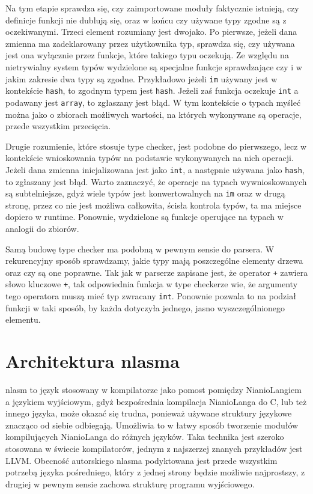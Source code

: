 \documentclass[licencjacka]{pracamgr}
\begin{document}
Na tym etapie sprawdza się, czy zaimportowane moduły faktycznie istnieją, czy definicje funkcji nie dublują się, oraz w końcu czy używane typy zgodne są z oczekiwanymi. Trzeci element rozumiany jest dwojako. Po pierwsze, jeżeli dana zmienna ma zadeklarowany przez użytkownika typ, sprawdza się, czy używana jest ona wyłącznie przez funkcje, które takiego typu oczekują.  Ze względu na nietrywialny system typów wydzielone są specjalne funkcje sprawdzające czy i w jakim zakresie dwa typy są zgodne. Przykładowo jeżeli \texttt{im} używany jest w kontekście \texttt{hash}, to zgodnym typem jest \texttt{hash}. Jeżeli zaś funkcja oczekuje \texttt{int} a podawany jest \texttt{array}, to zgłaszany jest błąd. W tym kontekście o typach myśleć można jako o zbiorach możliwych wartości, na których wykonywane są operacje, przede wszystkim przecięcia.

Drugie rozumienie, które stosuje type checker, jest podobne do pierwszego, lecz w kontekście wnioskowania typów na podstawie wykonywanych na nich operacji. Jeżeli dana zmienna inicjalizowana jest jako \texttt{int}, a następnie używana jako \texttt{hash}, to zgłaszany jest błąd. Warto zaznaczyć, że operacje na typach wywnioskowanych są subtelniejsze, gdyż wiele typów jest konwertowalnych na \texttt{im} oraz w drugą stronę, przez co nie jest możliwa całkowita, ścisła kontrola typów, ta ma miejsce dopiero w runtime. Ponownie, wydzielone są funkcje operujące na typach w analogii do zbiorów.

Samą budowę type checker ma podobną w pewnym sensie do parsera. W rekurencyjny sposób sprawdzamy, jakie typy mają poszczególne elementy drzewa oraz czy są one poprawne. Tak jak w parserze zapisane jest, że operator \texttt{+} zawiera słowo kluczowe \texttt{+}, tak odpowiednia funkcja w type checkerze wie, że argumenty tego operatora muszą mieć typ zwracany \texttt{int}. Ponownie pozwala to na podział funkcji w taki sposób, by każda dotyczyła jednego, jasno wyszczególnionego elementu.
\section{Architektura nlasma}
nlasm to język stosowany w kompilatorze jako pomost pomiędzy NianioLangiem a językiem wyjściowym, gdyż bezpośrednia kompilacja NianioLanga do C, lub też innego języka, może okazać się trudna, ponieważ używane struktury językowe znacząco od siebie odbiegają. Umożliwia to w łatwy sposób tworzenie modułów kompilujących NianioLanga do różnych języków. Taka technika jest szeroko stosowana w świecie kompilatorów, jednym z najszerzej znanych przykładów jest LLVM. Obecność autorskiego nlasma podyktowana jest przede wszystkim potrzebą języka pośredniego, który z jednej strony będzie możliwie najprostszy, z drugiej w pewnym sensie zachowa strukturę programu wyjściowego.
\end{document}
